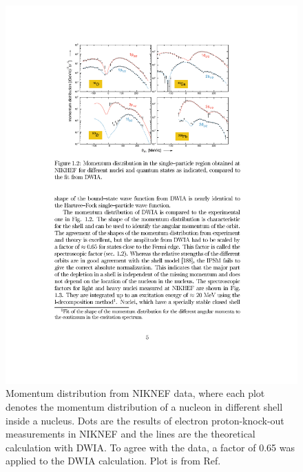  \begin{figure}[!ht]
  \begin{center}
    \includegraphics[type=pdf,ext=.pdf,read=.pdf,width=0.95\linewidth]{./figures/physics/Nikhefeep}
    \caption[Momentum distribution from NIKNEF data]{\footnotesize{Momentum distribution from NIKNEF data, where each plot denotes the momentum distribution of a nucleon in different shell inside a nucleus. Dots are the results of electron proton-knock-out measurements in NIKNEF and the lines are the theoretical calculation with DWIA. To agree with the data, a factor of 0.65 was applied to the DWIA calculation. Plot is from Ref.~\cite{VanDerSteenhoven1988547}}}
    \label{niknef_mom_dis}
  \end{center}
\end{figure} 

